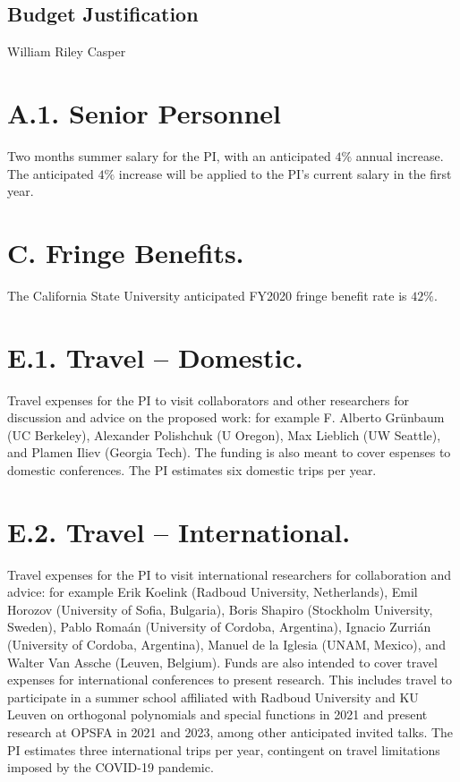 \documentclass[11pt,letterpaper]{article}
\newcommand{\required}[1]{\section*{\hfil #1\hfil}}                    %
\theoremstyle{definition}
\begin{document}
\begin{center}
\required{Budget Justification}
William Riley Casper
\end{center}

\section{A.1. Senior Personnel}
Two months summer salary for the PI, with an anticipated $4\%$ annual increase.
The anticipated $4\%$ increase will be applied to the PI's current salary in the first year.

\section{C. Fringe Benefits.}
The California State University anticipated FY2020 fringe benefit rate is $42\%$.

\section{E.1. Travel -- Domestic.}
Travel expenses for the PI to visit collaborators and other researchers for discussion and advice on the proposed work: for example F. Alberto Gr\"unbaum (UC Berkeley), Alexander Polishchuk (U Oregon), Max Lieblich (UW Seattle), and Plamen Iliev (Georgia Tech).
The funding is also meant to cover espenses to domestic conferences.
The PI estimates six domestic trips per year.

\section{E.2. Travel -- International.}
Travel expenses for the PI to visit international researchers for collaboration and advice: for example Erik Koelink (Radboud University, Netherlands), Emil Horozov (University of Sofia, Bulgaria), Boris Shapiro (Stockholm University, Sweden), Pablo Roma\'an (University of Cordoba, Argentina), Ignacio Zurri\'an (University of Cordoba, Argentina), Manuel de la Iglesia (UNAM, Mexico), and Walter Van Assche (Leuven, Belgium).
Funds are also intended to cover travel expenses for international conferences to present research.
This includes travel to participate in a summer school affiliated with Radboud University and KU Leuven on orthogonal polynomials and special functions in 2021 and present research at OPSFA in 2021 and 2023, among other anticipated invited talks.
The PI estimates three international trips per year, contingent on travel limitations imposed by the COVID-19 pandemic.
\end{document}
